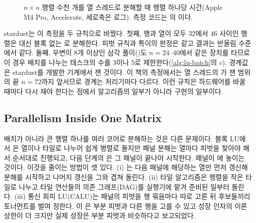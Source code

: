 \begin{figure}[t]
\centering
{}
\caption{$n\times n$ 행렬 수천 개를 열 스레드로 분해할 때 행렬 하나당 시간(Apple M4 Pro, Accelerate, 세로축은 로그). 측정 코드는 의 이다.}
\label{fig:lu-amx}
\end{figure}

stardust는 이 측정을 두 규칙으로 바꿨다. 첫째, 행과 열이 모두 $32$에서 $46$ 사이인 행렬은  대신 블록 없는 로 분해한다. 피벗 규칙과 특이의 판정은 같고 결과는 반올림 수준에서 같다. 둘째, 우변이 $8$개 이상인 삼각 풀이()도 $n=24$--$40$에서 같은 장치를 타므로 이 경우 배치를 나누는 태스크의 수를 $3$이나 $5$로 제한한다(\cref{alg:lu-batch}의 $c$). 경계값은 stardust를 개발한 기계에서 잰 것이다. 이 책의 측정에서는 열 스레드의 가 잰 범위의 끝 $n=72$까지 앞서므로 경계는 처리기마다 다르다. 이런 규칙은 하드웨어를 바꿀 때마다 다시 재야 한다는 점에서 알고리즘의 일부가 아니라 구현의 일부이다.

\subsection{Parallelism Inside One Matrix}

배치가 아니라 큰 행렬 하나를 여러 코어로 분해하는 것은 다른 문제이다. 블록 LU에서 은 열이나 타일로 나누어 쉽게 병렬로 돌지만 패널 분해는 열마다 피벗을 찾아야 해서 순서대로 진행되고, 다음 단계의 은 그 패널이 끝나야 시작한다. 패널이 에 놓이는 것이다. 이것을 줄이는 방법이 셋 있다. (i) 는 다음 패널에 해당하는 열만 먼저 갱신해 분해를 시작하고 나머지 갱신을 그와 겹쳐 돌린다. (ii) 타일 알고리즘은 행렬을 작은 타일로 나누고 타일 연산들의 의존 그래프(DAG)를 실행기에 맡겨 준비된 일부터 돌린다. (iii) 통신 회피 LU(CALU)는 패널의 피벗을 행 묶음마다 따로 고른 뒤 후보들끼리 토너먼트를 벌여 정한다\cite{grigori2011calu}. 이 은 부분 피벗과 다른 행을 고를 수 있고 성장 인자의 이론 상한이 더 크지만 실제 성장은 부분 피벗과 비슷하다고 보고되었다.

